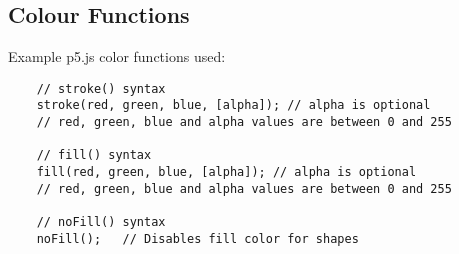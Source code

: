\documentclass{article}
\begin{document}
\newpage
\subsection*{Colour Functions}
\noindent Example p5.js color functions used:
    
\begin{verbatim}
    // stroke() syntax
    stroke(red, green, blue, [alpha]); // alpha is optional
    // red, green, blue and alpha values are between 0 and 255

    // fill() syntax
    fill(red, green, blue, [alpha]); // alpha is optional
    // red, green, blue and alpha values are between 0 and 255

    // noFill() syntax
    noFill();   // Disables fill color for shapes


\end{verbatim}
\end{document}
